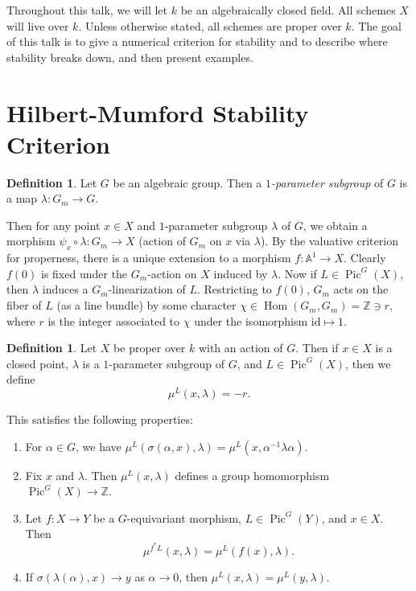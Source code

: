 \documentclass[leqno, openany]{memoir}
\theoremstyle{definition}
\newtheorem{defn}[thm]{Definition}
\theoremstyle{remark}
\theoremstyle{plain}
\theoremstyle{definition}
\theoremstyle{remark}
\newcommand{\A}{\mathbb{A}}
\newcommand{\Z}{\mathbb{Z}}
\newcommand{\mr}[1]{\mathrm{#1}}
\DeclareMathOperator{\Hom}{Hom}
\DeclareMathOperator{\Pic}{Pic}
\begin{document}
Throughout this talk, we will let $k$ be an algebraically closed field. All
schemes $X$ will live over $k$. Unless otherwise stated, all schemes are proper
over $k$. The goal of this talk is to give a numerical criterion for stability
and to describe where stability breaks down, and then present examples.

\section{Hilbert-Mumford Stability Criterion}%
\label{sec:hilbert_mumford_stability_criterion}

\begin{defn} Let $G$ be an algebraic group. Then a \textit{$1$-parameter
subgroup} of $G$ is a map $\lambda \colon G_m \to G$.  \end{defn}

Then for any point $x \in X$ and $1$-parameter subgroup $\lambda$ of $G$, we
obtain a morphism $\psi_x \circ \lambda \colon G_m \to X$ (action of $G_m$ on
$x$ via $\lambda$). By the valuative criterion for properness, there is a
unique extension to a morphism $f \colon \A^1 \to X$. Clearly $f(0)$ is fixed
under the $G_m$-action on $X$ induced by $\lambda$. Now if $L \in \Pic^G(X)$,
then $\lambda$ induces a $G_m$-linearization of $L$. Restricting to $f(0)$,
$G_m$ acts on the fiber of $L$ (as a line bundle) by some character $\chi \in
\Hom(G_m, G_m) = \Z \ni r$, where $r$ is the integer associated to $\chi$ under
the isomorphism $\mr{id} \mapsto 1$.

\begin{defn} Let $X$ be proper over $k$ with an action of $G$. Then if $x \in
    X$ is a closed point, $\lambda$ is a $1$-parameter subgroup of $G$, and $L
    \in \Pic^G(X)$, then we define \[ \mu^L(x, \lambda) = -r. \] \end{defn}

This satisfies the following properties: \begin{enumerate} \item For $\alpha
    \in G$, we have $\mu^L(\sigma(\alpha,x), \lambda) = \mu^L(x, \alpha^{-1}
    \lambda \alpha)$.  \item Fix $x$ and $\lambda$. Then $\mu^L(x, \lambda)$
    defines a group homomorphism $\Pic^G(X) \to \Z$.  \item Let $f \colon X \to
    Y$ be a $G$-equivariant morphism, $L \in \Pic^G(Y)$, and $x \in X$. Then \[
    \mu^{f^*L}(x, \lambda) = \mu^L(f(x), \lambda). \] \item If
    $\sigma(\lambda(\alpha), x) \to y$ as $\alpha \to 0$, then $\mu^L(x,
    \lambda) = \mu^L(y, \lambda)$.  \end{enumerate}
\end{document}
